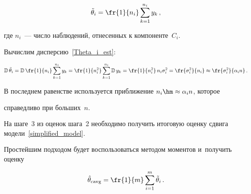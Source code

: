 \noindent


\begin{equation}


\label{Theta_i_est}


\tilde{\theta}_i = \fr{1}{n_i}\sum\limits_{k=1}^{n_i}y_k\,,


\end{equation}





\vspace*{-2pt}





\noindent


где $n_i$~--- число наблюдений, отнесенных к компоненте~$C_i$.








Вычислим дисперсию~\eqref{Theta_i_est}:


$$


\mathbb{D}\,\tilde{\theta}_i = \mathbb{D}\,\fr{1}{n_i}\sum\limits_{k=1}^{n_i}y_k = 


\fr{1}{n_i^2}\sum\limits_{k=1}^{n_i}\mathbb{D}\,y_k = \fr{1}{n_i^2}\, n_i 


\sigma_i^2 = \fr{\sigma_i^2}{n_i} \approx \fr{\sigma_i^2}{\alpha_i n}\,.


$$


В последнем равенстве используется приближение $n_i \hm\approx \alpha_i n$, которое 


справедливо при больших~$n$.








На шаге~3 из оценок шага~2 необходимо получить итоговую оценку сдвига модели~\eqref{simplified_model}.





Простейшим подходом будет воспользоваться методом моментов и~получить оценку





\vspace*{-3pt}





\noindent


\begin{equation}


\label{cavg_est}


\hat{\theta}_{\mathrm{cavg}} = \fr{1}{m}\sum\limits_{i=1}^m\tilde{\theta}_i\,.


\end{equation}





